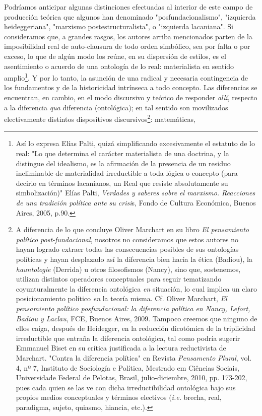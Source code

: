 Podríamos anticipar algunas distinciones efectuadas al interior de este
campo de producción teórica que algunos han denominado
"posfundacionalismo", "izquierda heideggeriana", "marxismo
postestructuralista", o "izquierda lacaniana". Si consideramos que, a
grandes rasgos, los autores arriba mencionados parten de la
imposibilidad real de auto-clausura de todo orden simbólico, sea por
falta o por exceso, lo que de algún modo los reúne, en su dispersión de
estilos, es el asentimiento o acuerdo de una ontología de lo real:
materialista en sentido amplio\footnote{Así lo expresa Elías Palti,
  quizá simplificando excesivamente el estatuto de lo real: "Lo que
  determina el carácter materialista de una doctrina, y la distingue del
  idealismo, es la afirmación de la presencia de un residuo ineliminable
  de materialidad irreductible a toda lógica o concepto (para decirlo en
  términos lacanianos, un Real que resiste absolutamente su
  simbolización)" Elías Palti, \emph{Verdades y saberes sobre el
  marxismo. Reacciones de una tradición política ante su crisi}s, Fondo
  de Cultura Económica, Buenos Aires, 2005, p.90.}. Y por lo tanto, la
asunción de una radical y necesaria contingencia de los fundamentos y de
la historicidad intrínseca a todo concepto. Las diferencias se
encuentran, en cambio, en el modo discursivo y teórico de responder
\emph{allí}, respecto a la diferencia \emph{qua} diferencia
(ontológica); en tal sentido son movilizados electivamente distintos
dispositivos discursivos\footnote{A diferencia de lo que concluye Oliver
  Marchart en su libro \emph{El pensamiento político post-fundacional},
  nosotros no consideramos que estos autores no hayan logrado extraer
  todas las consecuencias posibles de sus ontologías políticas y hayan
  desplazado así la diferencia bien hacia la ética (Badiou), la
  \emph{hauntologie} (Derrida) u otros filosofismos (Nancy), sino que,
  sostenemos, utilizan distintos operadores conceptuales para seguir
  tematizando coyunturalmente la diferencia ontológica \emph{en}
  situación, lo cual implica un claro posicionamiento político \emph{en}
  la teoría misma. Cf. Oliver Marchart, \emph{El pensamiento político
  posfundacional: la diferencia política en Nancy, Lefort, Badiou y
  Laclau}, FCE, Buenos Aires, 2009. Tampoco creemos que ninguno de ellos
  caiga, después de Heidegger, en la reducción dicotómica de la
  triplicidad irreductible que entraña la diferencia ontológica, tal
  como podría sugerir Emmanuel Biset en su crítica justificada a la
  lectura reductivista de Marchart. "Contra la diferencia política" en
  Revista \emph{Pensamento Plural}, vol. 4, nº 7, Instituto de
  Sociología e Política, Mestrado em Ciências Sociais, Universidade
  Federal de Pelotas, Brasil, julio-diciembre, 2010, pp. 173-202, pues
  cada quien se las ve con dicha irreductibilidad ontológica bajo sus
  propios medios conceptuales y términos electivos (\emph{i.e.} brecha,
  real, paradigma, sujeto, quiasmo, hiancia, etc.).}: matemáticas,
